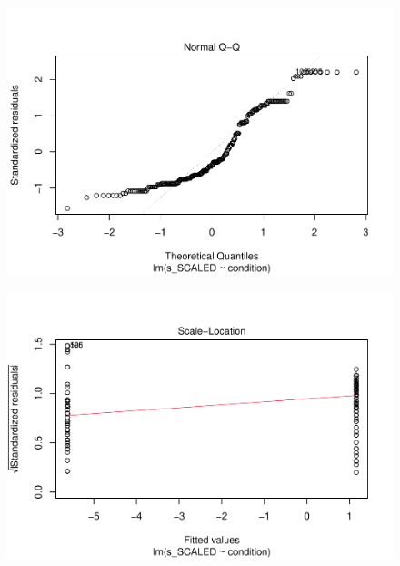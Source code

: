 \documentclass[
  letterpaper,
  DIV=11,
  numbers=noendperiod]{scrreprt}
\begin{document}
\begin{figure}[H]

{\centering \includegraphics{analysis/SGC3A/5_sgc3A_exploration_files/figure-pdf/unnamed-chunk-9-2.pdf}

}

\end{figure}

\begin{figure}[H]

{\centering \includegraphics{analysis/SGC3A/5_sgc3A_exploration_files/figure-pdf/unnamed-chunk-9-3.pdf}

}

\end{figure}
\end{document}
